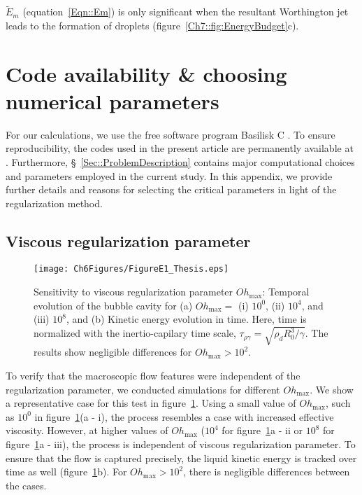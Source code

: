 \begin{subappendices}
\noindent$\tilde E_m$ (equation~\eqref{Eqn::Em}) is only significant when the resultant Worthington jet leads to the formation of droplets (figure~\ref{Ch7::fig:EnergyBudget}c). 

\section{Code availability \& choosing numerical parameters}\label{App::codes}

For our calculations, we use the free software program Basilisk C \citep{basiliskpopinet1, popinet2015quadtree}. To ensure reproducibility, the codes used in the present article are permanently available at \citet{basiliskVatsalVP}. Furthermore, \S~\ref{Sec::ProblemDescription} contains major computational choices and parameters employed in the current study. In this appendix, we provide further details and reasons for selecting the critical parameters in light of the regularization method. 

\subsection{Viscous regularization parameter}\label{App::OhMax}

\begin{figure}
	\centering
	\texttt{[image: Ch6Figures/FigureE1\_Thesis.eps]}
	\caption{Sensitivity to viscous regularization parameter $Oh_{\text{max}}$: Temporal evolution of the bubble cavity for (a) $Oh_{\text{max}} =$ (i) $10^0$, (ii) $10^4$, and (iii) $10^8$, and (b) Kinetic energy evolution in time. Here, time is normalized with the inertio-capilary time scale, $\tau_{\rho\gamma} = \sqrt{\rho_d R_0^3/\gamma}$. The results show negligible differences for $Oh_{\text{max}} > 10^2$.}
	\label{fig:OhMax}
\end{figure}

To verify that the macroscopic flow features were independent of the regularization parameter, we conducted simulations for different $Oh_\text{max}$. We show a representative case for this test in figure~\ref{fig:OhMax}. Using a small value of $Oh_\text{max}$, such as $10^0$ in figure~\ref{fig:OhMax}(a - i), the process resembles a case with increased effective viscosity. However, at higher values of $Oh_\text{max}$ ($10^4$ for figure~\ref{fig:OhMax}a - ii or $10^8$ for figure~\ref{fig:OhMax}a - iii), the process is independent of viscous regularization parameter. To ensure that the flow is captured precisely, the liquid kinetic energy is tracked over time as well (figure~\ref{fig:OhMax}b). For $Oh_{\text{max}} > 10^2$, there is negligible differences between the cases. 


\end{subappendices}
